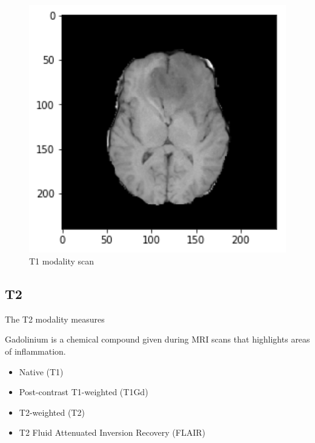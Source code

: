 \begin{figure}[H]
\centering
\includegraphics[width=14cm]{chapters/06_hdm/c_Brats18_2013_17_1_L1/41.png}
\caption{T1 modality scan}
\end{figure}

\subsection{T2}
The T2 modality measures


Gadolinium is a chemical compound given during MRI scans that highlights areas of inflammation.


\begin{itemize}
    \item Native (T1)
    \item Post-contrast T1-weighted (T1Gd)
    \item T2-weighted (T2)
    \item T2 Fluid Attenuated Inversion Recovery (FLAIR)
\end{itemize}